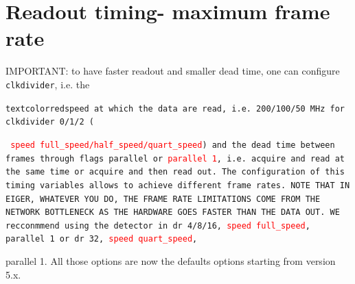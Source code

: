 \documentclass{article}
\begin{document}
\section{Readout timing- maximum frame rate}\label{timing}
IMPORTANT: to have faster readout and smaller dead time, one can configure {\tt{clkdivider}}, i.e. the {\tt{textcolor}{red}{speed} at which the data are read, i.e. 200/100/50~MHz for {\tt{clkdivider 0/1/2}} ({\tt{
\textcolor{red}{speed full\_speed/half\_speed/quart\_speed}}) and the dead time between frames through {\tt{flags parallel}} or {\tt{\textcolor{red}{parallel 1}}}, i.e. acquire and read at the same time or acquire and then read out.
The configuration of this timing variables allows to achieve different frame rates. NOTE THAT IN EIGER, WHATEVER YOU DO, THE FRAME RATE LIMITATIONS COME FROM THE NETWORK BOTTLENECK AS THE HARDWARE GOES FASTER THAN THE DATA OUT. WE recconmmend using the detector in \tt{dr 4/8/16}, \tt{\textcolor{red}{speed full\_speed}}, \tt{parallel 1} or \tt{dr 32}, \tt{\textcolor{red}{speed quart\_speed}}, \tt{parallel 1. All those options are now the defaults options starting from version 5.x.



}}}
\end{document}
